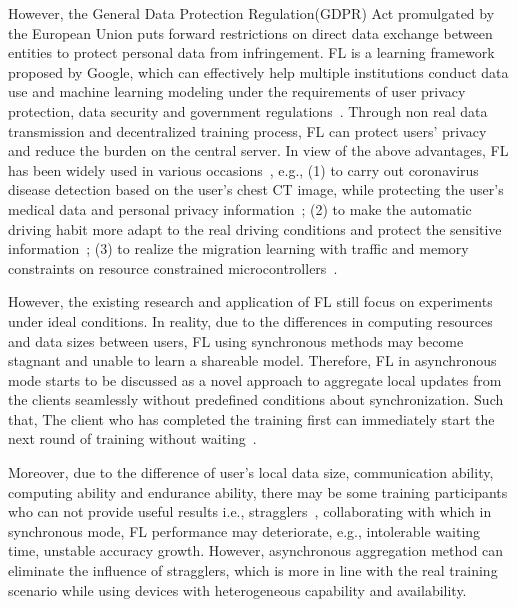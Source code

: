 \documentclass[twoside,twocolumn]{article}
\begin{document}
\begin{spacing}{1.0}
	However, the General Data Protection Regulation(GDPR) Act promulgated by the European Union puts forward restrictions on direct data exchange between entities to protect personal data from infringement. FL is a learning framework proposed by Google, which can effectively help multiple institutions conduct data use and machine learning modeling under the requirements of user privacy protection, data security and government regulations~\cite{b28,b29}. Through non real data transmission and decentralized training process, FL can protect users' privacy and reduce the burden on the central server. In view of the above advantages, FL has been widely used in various occasions~\cite{b21,b22,b23,b27}, e.g., (1) to carry out coronavirus disease detection based on the user's chest CT image, while protecting the user's medical data and personal privacy information~\cite{kumar2021blockchain}; (2)  to make the automatic driving habit more adapt to the real driving conditions and protect the sensitive information~\cite{li2021privacy}; (3) to realize the migration learning with traffic and memory constraints on resource constrained microcontrollers~\cite{kopparapu2022tinyfedtl}.
	
	However, the existing research and application of FL still focus on experiments under ideal conditions. In reality, due to the differences in computing resources and data sizes between users, FL using synchronous methods may become stagnant and unable to learn a shareable model. Therefore, FL in asynchronous mode starts to be discussed as a novel approach to aggregate local updates from the clients seamlessly without predefined conditions about synchronization. Such that, The client who has completed the training first can immediately start the next round of training without waiting~\cite{xie2019asynchronous,kairouz2021advances}. 
	
	Moreover, due to the difference of user's local data size, communication ability, computing ability and endurance ability, there may be some training participants who can not provide useful results i.e., stragglers~\cite{liu2022fed2a}, collaborating with which in synchronous mode, FL performance may deteriorate, e.g., intolerable waiting time, unstable accuracy growth. However, asynchronous aggregation method can eliminate the influence of stragglers, which is more in line with the real training scenario while using devices with heterogeneous capability and availability.


\end{spacing}
\end{document}
